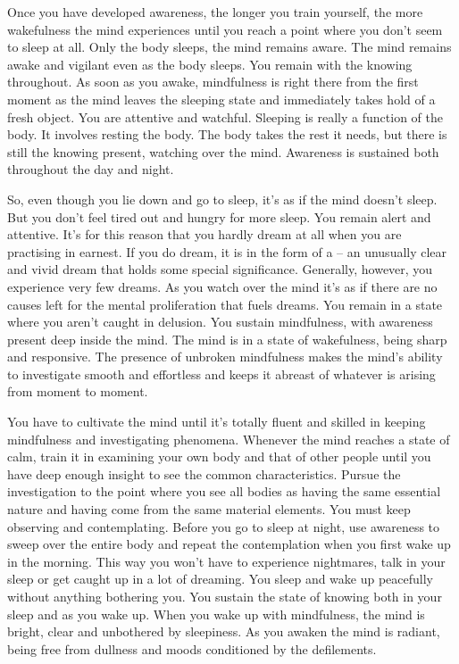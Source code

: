 Once you have developed awareness, the longer you train yourself, the more wakefulness the mind experiences until you reach a point where you don't seem to sleep at all. Only the body sleeps, the mind remains aware. The mind remains awake and vigilant even as the body sleeps. You remain with the knowing throughout. As soon as you awake, mindfulness is right there from the first moment as the mind leaves the sleeping state and immediately takes hold of a fresh object. You are attentive and watchful. Sleeping is really a function of the body. It involves resting the body. The body takes the rest it needs, but there is still the knowing present, watching over the mind. Awareness is sustained both throughout the day and night.

So, even though you lie down and go to sleep, it's as if the mind doesn't sleep. But you don't feel tired out and hungry for more sleep. You remain alert and attentive. It's for this reason that you hardly dream at all when you are practising in earnest. If you do dream, it is in the form of a  -- an unusually clear and vivid dream that holds some special significance. Generally, however, you experience very few dreams. As you watch over the mind it's as if there are no causes left for the mental proliferation that fuels dreams. You remain in a state where you aren't caught in delusion. You sustain mindfulness, with awareness present deep inside the mind. The mind is in a state of wakefulness, being sharp and responsive. The presence of unbroken mindfulness makes the mind's ability to investigate smooth and effortless and keeps it abreast of whatever is arising from moment to moment. 

You have to cultivate the mind until it's totally fluent and skilled in keeping mindfulness and investigating phenomena. Whenever the mind reaches a state of calm, train it in examining your own body and that of other people until you have deep enough insight to see the common characteristics. Pursue the investigation to the point where you see all bodies as having the same essential nature and having come from the same material elements. You must keep observing and contemplating. Before you go to sleep at night, use awareness to sweep over the entire body and repeat the contemplation when you first wake up in the morning. This way you won't have to experience nightmares, talk in your sleep or get caught up in a lot of dreaming. You sleep and wake up peacefully without anything bothering you. You sustain the state of knowing both in your sleep and as you wake up. When you wake up with mindfulness, the mind is bright, clear and unbothered by sleepiness. As you awaken the mind is radiant, being free from dullness and moods conditioned by the defilements. 

